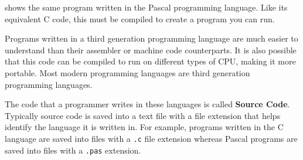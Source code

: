  shows the same program written in the Pascal programming language. Like its equivalent C code, this must be compiled to create a program you can run.

Programs written in a third generation programming language are much easier to understand than their assembler or machine code counterparts. It is also possible that this code can be compiled to run on different types of CPU, making it more portable. Most modern programming languages are third generation programming languages.


The code that a programmer writes in these languages is called \textbf{Source Code}. Typically source code is saved into a text file with a file extension that helps identify the language it is written in. For example, programs written in the C language are saved into files with a {\tt .c} file extension whereas Pascal programs are saved into files with a {\tt .pas} extension.





